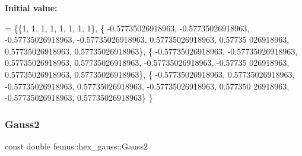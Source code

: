 {\bfseries Initial value\+:}
\begin{DoxyCode}
= \{\{1, 1, 1, 1, 1, 1, 1, 1\},
    \{ -0.57735026918963, -0.57735026918963, -0.57735026918963, -0.57735026918963, 0.57735026918963, 0.57735
      026918963, 0.57735026918963, 0.57735026918963\},
    \{ -0.57735026918963, -0.57735026918963, 0.57735026918963, 0.57735026918963, -0.57735026918963, -0.57735
      026918963, 0.57735026918963, 0.57735026918963\},
    \{ -0.57735026918963, 0.57735026918963, -0.57735026918963, 0.57735026918963, -0.57735026918963, 0.577350
      26918963, -0.57735026918963, 0.57735026918963\}
  \}
\end{DoxyCode}
\mbox{\label{classfemus_1_1hex__gauss_a9cb855ddaa9d2e95bebc34f0220abb4f}} 
\subsubsection{\texorpdfstring{Gauss2}{Gauss2}}
{\footnotesize\ttfamily const double femus\+::hex\+\_\+gauss\+::\+Gauss2\hspace{0.3cm}{\ttfamily [static]}}

